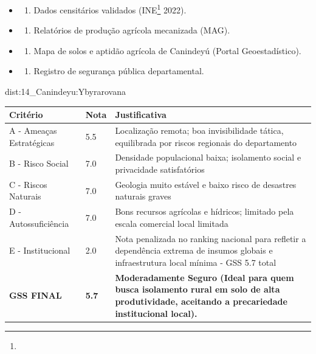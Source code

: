 {\begin{itemize}
\tightlist
\item
  \begin{enumerate}
  \def\labelenumi{\arabic{enumi})}
  \tightlist
  \item
    Dados censitários validados (INE\footnote{\fineINE} 2022).
  \end{enumerate}
\item
  \begin{enumerate}
  \def\labelenumi{\arabic{enumi})}
  \setcounter{enumi}{1}
  \tightlist
  \item
    Relatórios de produção agrícola mecanizada (MAG).
  \end{enumerate}
\item
  \begin{enumerate}
  \def\labelenumi{\arabic{enumi})}
  \setcounter{enumi}{2}
  \tightlist
  \item
    Mapa de solos e aptidão agrícola de Canindeyú (Portal
    Geoestadístico).
  \end{enumerate}
\item
  \begin{enumerate}
  \def\labelenumi{\arabic{enumi})}
  \setcounter{enumi}{3}
  \tightlist
  \item
    Registro de segurança pública departamental.
  \end{enumerate}
\end{itemize}}{dist:14_Canindeyu:Ybyrarovana}
\begin{table}[ht!]
\small \begin{tabular}{p{3.0cm}p{0.8cm}p{6.0cm}} \toprule
\textbf{Critério} & \textbf{Nota} & \textbf{Justificativa} \\ \midrule
A - Ameaças Estratégicas & 5.5 & Localização remota; boa invisibilidade tática, equilibrada por riscos regionais do departamento \\
B - Risco Social & 7.0 & Densidade populacional baixa; isolamento social e privacidade satisfatórios \\
C - Riscos Naturais & 7.0 & Geologia muito estável e baixo risco de desastres naturais graves \\
D - Autossuficiência & 7.0 & Bons recursos agrícolas e hídricos; limitado pela escala comercial local limitada \\
E - Institucional & 2.0 & Nota penalizada no ranking nacional para refletir a dependência extrema de insumos globais e infraestrutura local mínima - GSS 5.7 total \\
\midrule \textbf{GSS FINAL} & \textbf{5.7} & \textbf{Moderadamente Seguro (Ideal para quem busca isolamento rural em solo de alta produtividade, aceitando a precariedade institucional local).} \\ \bottomrule \end{tabular}
\end{table}
